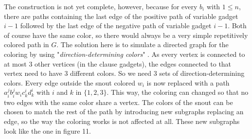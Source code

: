 \documentclass[12pt,a4paper]{article}
\begin{document}
\newline
The construction is not yet complete, however, because for every $b_i$ with $1 \leq n$, there are paths containing the last edge of the positive path of variable gadget $i-1$ followed by the last edge of the negative path of variable gadget $i-1$. Both of course have the same color, so there would always be a very simple repetitively colored path in $G$. The solution here is to simulate a directed graph for the coloring by using "\textit{direction-determining colors}" \citep[p. 6]{Manin2008}. As every vertex is connected to at most 3 other vertices (in the clause gadgets), the edges connected to that vertex need to have 3 different colors. So we need 3 sets of direction-determining colors. Every edge outside the snout colored $w_i$ is now replaced with a path $a^j_ib^j_iw_ic^i_kd^i_k$ with $i$ and $k$ in $\{ 1, 2, 3 \}$. This way, the coloring can changed so that no two edges with the same color share a vertex. The colors of the snout can be chosen to match the rest of the path by introducing new subgraphs replacing an edge, so the way the coloring works is not affected at all. These new subgraphs look like the one in figure 11.
\newline
\end{document}
